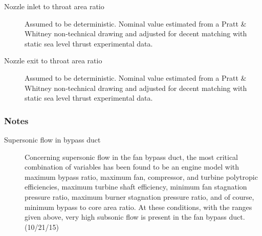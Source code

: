 \documentclass{article}
\begin{document}
\begin{description}
\item[Nozzle inlet to throat area ratio] Assumed to be deterministic. Nominal value estimated from a Pratt \& Whitney non-technical drawing and adjusted for decent matching with static sea level thrust experimental data.
\item[Nozzle exit to throat area ratio] Assumed to be deterministic. Nominal value estimated from a Pratt \& Whitney non-technical drawing and adjusted for decent matching with static sea level thrust experimental data.
\end{description}

\subsubsection{Notes}

\begin{description}
\item[Supersonic flow in bypass duct] Concerning supersonic flow in the fan bypass duct, the most critical combination of variables has been found to be an engine model with maximum bypass ratio, maximum fan, compressor, and turbine polytropic efficiencies, maximum turbine shaft efficiency, minimum fan stagnation pressure ratio, maximum burner stagnation pressure ratio, and of course, minimum bypass to core area ratio. At these conditions, with the ranges given above, very high subsonic flow is present in the fan bypass duct. (10/21/15)
\end{description}



\end{document}
